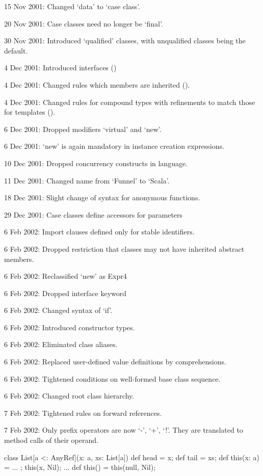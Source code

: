 \documentclass[11pt]{report}
\begin{document}
{15 Nov 2001: Changed `data' to `case class'.

20 Nov 2001: Case classes need no longer be `final'.

30 Nov 2001: Introduced `qualified' classes, with unqualified classes
being the default.

4 Dec 2001: Introduced interfaces ()

4 Dec 2001: Changed rules which members are inherited ().

4 Dec 2001: Changed rules for compound types with refinements to match
those for templates ().

6 Dec 2001: Dropped modifiers `virtual' and `new'.

6 Dec 2001: `new' is again mandatory in instance creation expressions.

10 Dec 2001: Dropped concurrency constructs in language.

11 Dec 2001: Changed name from `Funnel' to `Scala'.

18 Dec 2001: Slight change of syntax for anonymous functions.

29 Dec 2001: Case classes define accessors for parameters

6 Feb 2002: Import clauses defined only for stable identifiers.

6 Feb 2002: Dropped restriction that classes may not have
inherited abstract members.

6 Feb 2002: Reclassified `new' as Expr4

6 Feb 2002: Dropped interface keyword

6 Feb 2002: Changed syntax of `if'.

6 Feb 2002: Introduced constructor types.

6 Feb 2002: Eliminated class aliases.

6 Feb 2002: Replaced user-defined value definitions by comprehensions.

6 Feb 2002: Tightened conditions on well-formed base class sequence.

6 Feb 2002: Changed root class hierarchy.

7 Feb 2002: Tightened rules on forward references.

7 Feb 2002: Only prefix operators are now `-', `+', `!'. They are
translated to method calls of their operand.
}

class List[a <: AnyRef](x: a, xs: List[a]) {
  def head = x;
  def tail = xs;
  def this(x: a) = { ... ; this(x, Nil); ... }
  def this()     = this(null, Nil);
}
\end{document}

